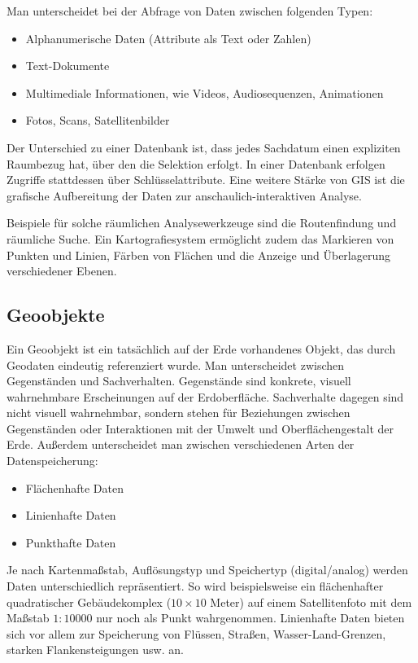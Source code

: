 \documentclass[11pt,ceqn]{book}
\begin{document}
Man unterscheidet bei der Abfrage von Daten zwischen folgenden Typen:
\begin{itemize}
\item Alphanumerische Daten (Attribute als Text oder Zahlen)
\item Text-Dokumente 
\item Multimediale Informationen, wie Videos, Audiosequenzen, Animationen 
\item Fotos, Scans, Satellitenbilder
\end{itemize}

Der Unterschied zu einer Datenbank ist, dass jedes Sachdatum einen expliziten Raumbezug hat, über den die Selektion erfolgt. In einer Datenbank erfolgen Zugriffe stattdessen über Schlüsselattribute. Eine weitere Stärke von GIS ist die grafische Aufbereitung der Daten zur anschaulich-interaktiven Analyse.

Beispiele für solche räumlichen Analysewerkzeuge sind die Routenfindung und räumliche Suche. Ein Kartografiesystem ermöglicht zudem das Markieren von Punkten und Linien, Färben von Flächen und die Anzeige und Überlagerung verschiedener Ebenen.

\subsection{Geoobjekte}
Ein Geoobjekt ist ein tatsächlich auf der Erde vorhandenes Objekt, das durch Geodaten eindeutig referenziert wurde. Man unterscheidet zwischen Gegenständen und Sachverhalten. Gegenstände sind konkrete, visuell wahrnehmbare Erscheinungen auf der Erdoberfläche. Sachverhalte dagegen sind nicht visuell wahrnehmbar, sondern stehen für Beziehungen zwischen Gegenständen oder Interaktionen mit der Umwelt und Oberflächengestalt der Erde.
Außerdem unterscheidet man zwischen verschiedenen Arten der Datenspeicherung:
\begin{itemize}
\item Flächenhafte Daten
\item Linienhafte Daten
\item Punkthafte Daten
\end{itemize}
Je nach Kartenmaßstab, Auflösungstyp und Speichertyp (digital/analog) werden Daten unterschiedlich repräsentiert. So wird beispielsweise ein flächenhafter quadratischer Gebäudekomplex ($10 \times 10$ Meter) auf einem Satellitenfoto mit dem Maßstab $1:10000$ nur noch als Punkt wahrgenommen. Linienhafte Daten bieten sich vor allem zur Speicherung von Flüssen, Straßen, Wasser-Land-Grenzen, starken Flankensteigungen usw. an.
\end{document}
